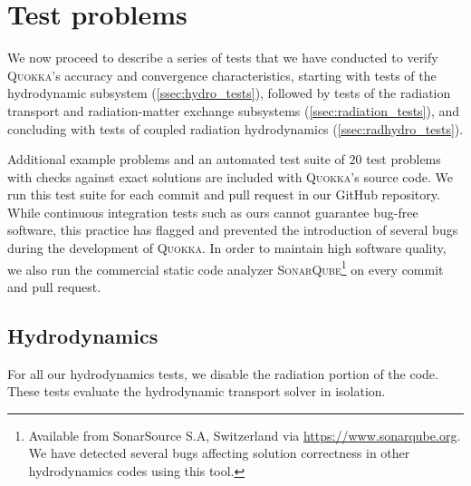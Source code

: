 \documentclass[fleqn,usenatbib]{mnras}
\newcommand{\quokka}{\textsc{Quokka}}
\begin{document}
\section{Test problems}
\label{section:tests}

We now proceed to describe a series of tests that we have conducted to verify \quokka's accuracy and convergence characteristics, starting with tests of the hydrodynamic subsystem (\autoref{ssec:hydro_tests}), followed by tests of the radiation transport and radiation-matter exchange subsystems (\autoref{ssec:radiation_tests}), and concluding with tests of coupled radiation hydrodynamics (\autoref{ssec:radhydro_tests}).

Additional example problems and an automated test suite of $20$ test problems with checks against exact solutions are included with \textsc{Quokka}'s source code. We run this test suite for each commit and pull request in our GitHub repository. While continuous integration tests such as ours cannot guarantee bug-free software, this practice has flagged and prevented the introduction of several bugs during the development of \textsc{Quokka}. In order to maintain high software quality, we also run the commercial static code analyzer \textsc{SonarQube}\footnote{Available from SonarSource S.A, Switzerland via \url{https://www.sonarqube.org}. We have detected several bugs affecting solution correctness in other hydrodynamics codes using this tool.} on every commit and pull request.

\subsection{Hydrodynamics}
\label{ssec:hydro_tests}

For all our hydrodynamics tests, we disable the radiation portion of the code. These tests evaluate the hydrodynamic transport solver in isolation.
\end{document}
